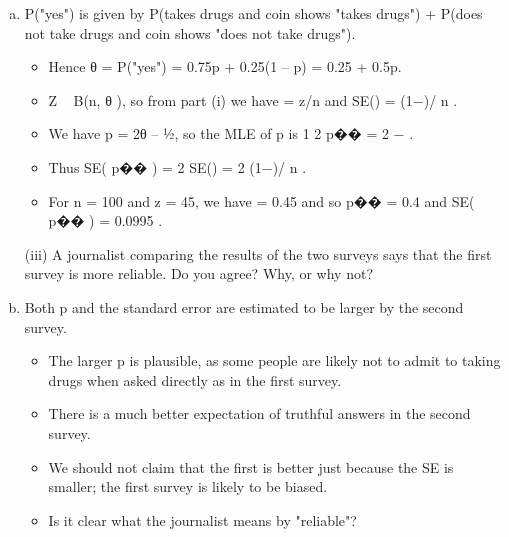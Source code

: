 \documentclass[a4paper,12pt]{article}
\begin{document}
\begin{enumerate}[(a)]
\item P("yes") is given by P(takes drugs and coin shows "takes drugs") + P(does not
take drugs and coin shows "does not take drugs").
\begin{itemize}
    \item Hence θ = P("yes") = 0.75p + 0.25(1 – p) = 0.25 + 0.5p.
    \item Z ~ B(n, θ ), so from part (i) we have  = z/n and SE() =  (1−)/ n .
    \item We have p = 2θ – ½, so the MLE of p is 1
2
p�� = 2 − .
    \item Thus SE( p�� ) = 2 SE() = 2  (1−)/ n .
    \item For n = 100 and z = 45, we have  = 0.45 and so p�� = 0.4 and SE( p�� ) = 0.0995 .
\end{itemize}
\newpage

\begin{framed}
(iii) A journalist comparing the results of the two surveys says that the first survey
is more reliable. Do you agree? Why, or why not?

\end{framed}
\item Both p and the standard error are estimated to be larger by the second survey.
\begin{itemize}
    \item The larger p is plausible, as some people are likely not to admit to taking drugs when
asked directly as in the first survey.
    \item There is a much better expectation of truthful
answers in the second survey.
    \item We should not claim that the first is better just because
the SE is smaller; the first survey is likely to be biased. 
    \item Is it clear what the journalist
means by "reliable"?
\end{itemize}

\end{enumerate}
\end{document}
